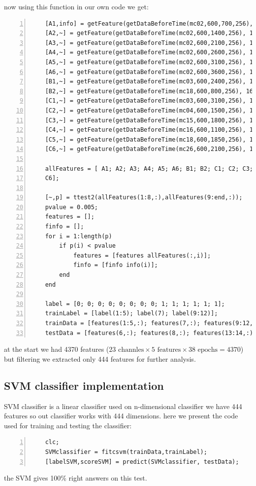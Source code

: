 \documentclass[11pt]{article}
\begin{document}
now using this function in our own code we get: \\
\begin{lstlisting}[backgroundcolor=\color{lbcolor}, frame=single,
    numbers=left,style=Matlab-editor]
    %% Feature extraction Section
    [A1,info] = getFeature(getDataBeforeTime(mc02,600,700,256), 16, 256);
    [A2,~] = getFeature(getDataBeforeTime(mc02,600,1400,256), 16, 256);
    [A3,~] = getFeature(getDataBeforeTime(mc02,600,2100,256), 16, 256);
    [A4,~] = getFeature(getDataBeforeTime(mc02,600,2600,256), 16, 256);
    [A5,~] = getFeature(getDataBeforeTime(mc02,600,3100,256), 16, 256);
    [A6,~] = getFeature(getDataBeforeTime(mc02,600,3600,256), 16, 256);
    [B1,~] = getFeature(getDataBeforeTime(mc03,600,2400,256), 16, 256);
    [B2,~] = getFeature(getDataBeforeTime(mc18,600,800,256), 16, 256);
    [C1,~] = getFeature(getDataBeforeTime(mc03,600,3100,256), 16, 256);
    [C2,~] = getFeature(getDataBeforeTime(mc04,600,1500,256), 16, 256);
    [C3,~] = getFeature(getDataBeforeTime(mc15,600,1800,256), 16, 256);
    [C4,~] = getFeature(getDataBeforeTime(mc16,600,1100,256), 16, 256);
    [C5,~] = getFeature(getDataBeforeTime(mc18,600,1850,256), 16, 256);
    [C6,~] = getFeature(getDataBeforeTime(mc26,600,2100,256), 16, 256);
    
    allFeatures = [ A1; A2; A3; A4; A5; A6; B1; B2; C1; C2; C3; C4; C5; 
    C6];
    
    [~,p] = ttest2(allFeatures(1:8,:),allFeatures(9:end,:));
    pvalue = 0.005;
    features = [];
    finfo = [];
    for i = 1:length(p)
        if p(i) < pvalue
            features = [features allFeatures(:,i)];
            finfo = [finfo info(i)];
        end
    end
    
    label = [0; 0; 0; 0; 0; 0; 0; 0; 1; 1; 1; 1; 1; 1];
    trainLabel = [label(1:5); label(7); label(9:12)];
    trainData = [features(1:5,:); features(7,:); features(9:12,:)];
    testData = [features(6,:); features(8,:); features(13:14,:)];
\end{lstlisting}

at the start we had 4370 features ($23 \text{ channles} \times 5 
\text{ features} \times 38 \text{ epochs} =  4370$) but filtering
we extracted only 444 features for further analysis. \\

\subsection{SVM classifier implementation}
SVM classifier is a linear classifier used on n-dimensional classifier we have 444
features so out classifier works with 444 dimensions. here we present the code used for training and testing the classifier: \\
\begin{lstlisting}[backgroundcolor=\color{lbcolor}, frame=single,
    numbers=left,style=Matlab-editor]
    %% SVM
    clc;
    SVMclassifier = fitcsvm(trainData,trainLabel);
    [labelSVM,scoreSVM] = predict(SVMclassifier, testData);    
\end{lstlisting}
the SVM gives 100\% right answers on this test. \\
\end{document}
